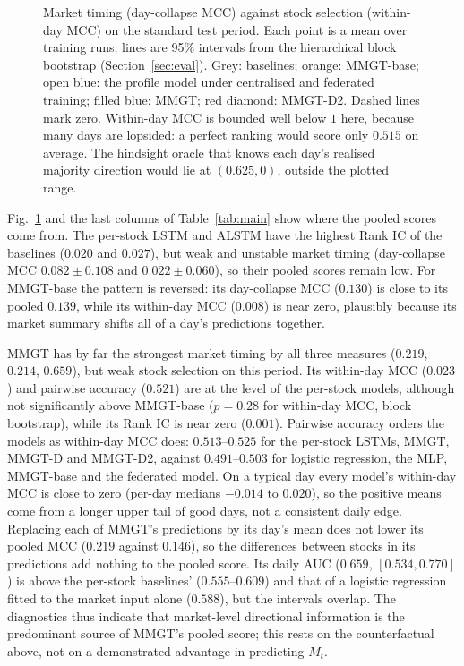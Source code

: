 \documentclass[conference]{IEEEtran}
\begin{document}
\begin{figure}[t]
\begin{tikzpicture}
\end{tikzpicture}
\caption{Market timing (day-collapse MCC) against stock selection (within-day MCC)
on the standard test period. Each point is a mean over training runs; lines are 95\%
intervals from the hierarchical block bootstrap (Section~\ref{sec:eval}). Grey:
baselines; orange: MMGT-base; open blue: the profile model under centralised and
federated training; filled blue: MMGT; red diamond: MMGT-D2. Dashed lines mark zero.
Within-day MCC is bounded well below $1$ here, because many days are lopsided: a
perfect ranking would score only $0.515$ on average. The hindsight oracle that knows each day's
realised majority direction would lie at $(0.625, 0)$, outside the plotted range.}
\label{fig:timing}
\end{figure}

Fig.~\ref{fig:timing} and the last columns of Table~\ref{tab:main} show where the
pooled scores come from. The per-stock LSTM and ALSTM have the highest Rank IC of the
baselines ($0.020$ and $0.027$), but weak and unstable market timing (day-collapse
MCC $0.082\pm0.108$ and $0.022\pm0.060$), so their pooled scores remain low. For
MMGT-base the pattern is reversed: its day-collapse MCC ($0.130$) is close to its
pooled $0.139$, while its within-day MCC ($0.008$) is near zero, plausibly because its
market summary shifts all of a day's predictions together.

MMGT has by far the strongest market timing by all three measures ($0.219$, $0.214$,
$0.659$), but weak stock selection on this period. Its within-day MCC ($0.023$) and
pairwise accuracy ($0.521$) are at the level of the per-stock models, although not
significantly above MMGT-base ($p=0.28$ for within-day MCC, block bootstrap), while
its Rank IC is near zero ($0.001$). Pairwise accuracy orders the models as within-day
MCC does: $0.513$--$0.525$ for the per-stock LSTMs, MMGT, MMGT-D and MMGT-D2, against
$0.491$--$0.503$ for logistic regression, the MLP, MMGT-base and the federated model.
On a typical day every model's within-day MCC is close to zero (per-day medians
$-0.014$ to $0.020$), so the positive means come from a longer upper tail of good
days, not a consistent daily edge. Replacing each of MMGT's predictions by its day's
mean does not lower its pooled MCC ($0.219$ against $0.146$), so the differences
between stocks in its predictions add nothing to the pooled score. Its daily AUC
($0.659$, $[0.534, 0.770]$) is above the per-stock baselines' ($0.555$--$0.609$) and
that of a logistic regression fitted to the market input alone ($0.588$), but the
intervals overlap. The diagnostics thus indicate that market-level directional
information is the predominant source of MMGT's pooled score; this rests on the
counterfactual above, not on a demonstrated advantage in predicting $M_t$.
\end{document}

